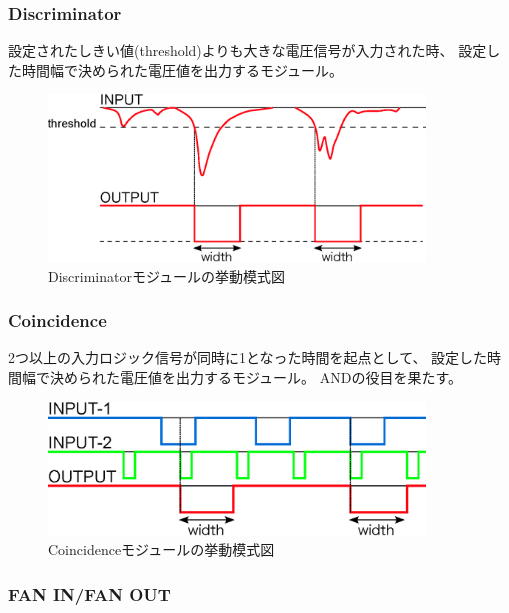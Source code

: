 \documentclass{jarticle}
\begin{document}
    \subsubsection*{Discriminator}
	  
	  設定されたしきい値(threshold)よりも大きな電圧信号が入力された時、
	  設定した時間幅で決められた電圧値を出力するモジュール。
 	  
	  \begin{figure}[htbp]
	   \begin{center}
	    \includegraphics[width = 100mm]{./picture/Discriminator.eps}
	   \end{center}
	   \caption{Discriminatorモジュールの挙動模式図}
	   \label{Fig:Discri}
	  \end{figure}
	  
    	  \subsubsection*{Coincidence}
	  
	  2つ以上の入力ロジック信号が同時に1となった時間を起点として、
	  設定した時間幅で決められた電圧値を出力するモジュール。
	  ANDの役目を果たす。
	  
	  \begin{figure}[htbp]
	   \begin{center}
	    \includegraphics[width = 100mm]{./picture/Coincidence.eps}
	   \end{center}
	   \caption{Coincidenceモジュールの挙動模式図}
	   \label{Fig:Coincidence}
	  \end{figure}
	  
   \subsubsection*{FAN IN/FAN OUT}
	  
\end{document}
